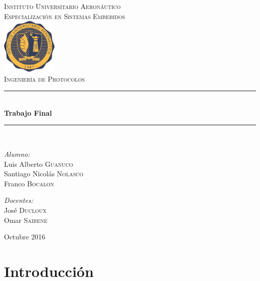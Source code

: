 \documentclass[11pt,oneside,spanish,a4paper]{article}
\newcommand{\HRule}{\rule{\linewidth}{0.5mm}}
\begin{document}

\begin{titlepage}
\begin{center}

\textsc{\LARGE Instituto Universitario Aeronáutico}\\[0.5cm]
\textsc{\LARGE Especialización en Sistemas Embebidos}\\[2cm]

\includegraphics[width=0.2\textwidth]{img/logo_f_blanco}~\\[2cm]

\textsc{\Large Ingeniería de Protocolos}\\[0.5cm]

\HRule \\[0.4cm]
{ \huge \bfseries Trabajo Final \\[0.4cm] }

\HRule \\[1.5cm]

\begin{minipage}{0.4\textwidth}
\begin{flushleft} \large
\emph{Alumno:}\\
Luis Alberto \textsc{Guanuco}\\
Santiago Nicolás \textsc{Nolasco}\\
Franco \textsc{Bocalon}
\end{flushleft}
\end{minipage}
\begin{minipage}{0.4\textwidth}
\begin{flushright} \large
\emph{Docentes:} \\
José \textsc{Ducloux}\\
Omar \textsc{Saibene}
\end{flushright}
\end{minipage}
\vfill
{\large Octubre 2016}

\end{center}
\end{titlepage}


\tableofcontents{}

\section{Introducción}
\label{sec:intro}
\end{document}
